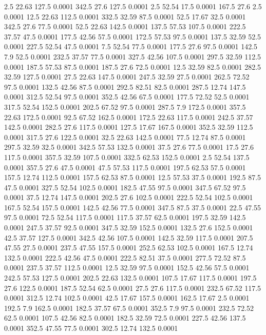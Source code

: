 2.5	22.63	127.5	0.0001
342.5	27.6	127.5	0.0001
2.5	52.54	17.5	0.0001
167.5	27.6	2.5	0.0001
12.5	22.63	112.5	0.0001
332.5	32.59	87.5	0.0001
52.5	17.67	32.5	0.0001
342.5	27.6	77.5	0.0001
52.5	22.63	142.5	0.0001
137.5	57.53	107.5	0.0001
222.5	37.57	47.5	0.0001
177.5	42.56	57.5	0.0001
172.5	57.53	97.5	0.0001
137.5	32.59	52.5	0.0001
227.5	52.54	47.5	0.0001
7.5	52.54	77.5	0.0001
177.5	27.6	97.5	0.0001
142.5	7.9	52.5	0.0001
232.5	37.57	77.5	0.0001
327.5	42.56	107.5	0.0001
297.5	32.59	112.5	0.0001
187.5	57.53	87.5	0.0001
187.5	27.6	72.5	0.0001
12.5	32.59	82.5	0.0001
282.5	32.59	127.5	0.0001
27.5	22.63	147.5	0.0001
247.5	32.59	27.5	0.0001
262.5	72.52	97.5	0.0001
132.5	42.56	87.5	0.0001
292.5	82.51	82.5	0.0001
287.5	12.74	147.5	0.0001
312.5	52.54	97.5	0.0001
352.5	42.56	67.5	0.0001
177.5	72.52	52.5	0.0001
317.5	52.54	152.5	0.0001
202.5	67.52	97.5	0.0001
287.5	7.9	172.5	0.0001
357.5	22.63	172.5	0.0001
92.5	67.52	162.5	0.0001
172.5	22.63	117.5	0.0001
242.5	37.57	142.5	0.0001
282.5	27.6	117.5	0.0001
127.5	17.67	167.5	0.0001
352.5	32.59	112.5	0.0001
317.5	27.6	122.5	0.0001
32.5	22.63	142.5	0.0001
77.5	12.74	87.5	0.0001
297.5	32.59	32.5	0.0001
342.5	57.53	132.5	0.0001
37.5	27.6	77.5	0.0001
17.5	27.6	117.5	0.0001
357.5	32.59	107.5	0.0001
332.5	62.53	152.5	0.0001
2.5	52.54	137.5	0.0001
357.5	27.6	47.5	0.0001
47.5	57.53	117.5	0.0001
197.5	62.53	57.5	0.0001
157.5	12.74	112.5	0.0001
157.5	62.53	87.5	0.0001
12.5	57.53	37.5	0.0001
192.5	87.5	47.5	0.0001
327.5	52.54	102.5	0.0001
182.5	47.55	97.5	0.0001
347.5	67.52	97.5	0.0001
37.5	12.74	147.5	0.0001
202.5	27.6	102.5	0.0001
222.5	52.54	102.5	0.0001
167.5	52.54	157.5	0.0001
142.5	42.56	77.5	0.0001
347.5	87.5	37.5	0.0001
22.5	47.55	97.5	0.0001
72.5	52.54	117.5	0.0001
117.5	37.57	62.5	0.0001
197.5	32.59	142.5	0.0001
247.5	37.57	92.5	0.0001
347.5	32.59	152.5	0.0001
132.5	27.6	152.5	0.0001
42.5	37.57	127.5	0.0001
342.5	42.56	107.5	0.0001
142.5	32.59	117.5	0.0001
207.5	47.55	27.5	0.0001
237.5	47.55	157.5	0.0001
252.5	62.53	102.5	0.0001
167.5	12.74	132.5	0.0001
222.5	42.56	47.5	0.0001
222.5	82.51	37.5	0.0001
277.5	72.52	87.5	0.0001
237.5	37.57	112.5	0.0001
12.5	32.59	97.5	0.0001
152.5	42.56	57.5	0.0001
242.5	57.53	127.5	0.0001
202.5	22.63	132.5	0.0001
107.5	17.67	117.5	0.0001
197.5	27.6	122.5	0.0001
187.5	52.54	62.5	0.0001
27.5	27.6	117.5	0.0001
232.5	67.52	117.5	0.0001
312.5	12.74	102.5	0.0001
42.5	17.67	157.5	0.0001
162.5	17.67	2.5	0.0001
192.5	7.9	162.5	0.0001
182.5	37.57	67.5	0.0001
352.5	7.9	97.5	0.0001
232.5	72.52	62.5	0.0001
107.5	42.56	82.5	0.0001
182.5	32.59	72.5	0.0001
227.5	42.56	137.5	0.0001
352.5	47.55	77.5	0.0001
302.5	12.74	132.5	0.0001
